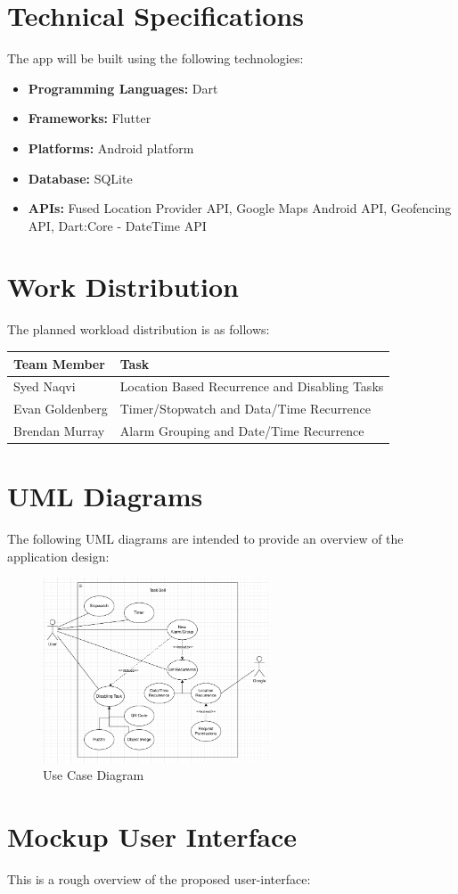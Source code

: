 \documentclass{article}
\begin{document}
\section{Technical Specifications}
The app will be built using the following technologies:
\begin{itemize}
    \item \textbf{Programming Languages:} Dart
    \item \textbf{Frameworks:} Flutter
    \item \textbf{Platforms:} Android platform
    \item \textbf{Database:} SQLite
    \item \textbf{APIs:} Fused Location Provider API, Google Maps Android API, Geofencing API, Dart:Core - DateTime API
\end{itemize}

\section{Work Distribution}
The planned workload distribution is as follows:\\

\renewcommand{\arraystretch}{1.5} %
\begin{tabular}{|p{3cm}|p{8cm}|}
    \hline
    \textbf{Team Member} & \textbf{Task} \\
    \hline
    Syed Naqvi        & Location Based Recurrence and Disabling Tasks \\
    \hline
    Evan Goldenberg   & Timer/Stopwatch and Data/Time Recurrence \\
    \hline
    Brendan Murray    & Alarm Grouping and Date/Time Recurrence \\
    \hline
\end{tabular}

\newpage

\section{UML Diagrams}
The following UML diagrams are intended to provide an overview of the application design:
\begin{figure}[h!]
    \centering
    \includegraphics[width=0.6\textwidth, height=0.3\textheight]{../Use_Case_Diagram.png}
    \caption{Use Case Diagram}
\end{figure}

\section{Mockup User Interface}
This is a rough overview of the proposed user-interface:
\end{document}
